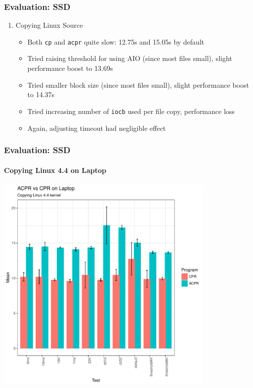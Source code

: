\documentclass{beamer}
\begin{document}
\begin{frame}
\frametitle{Evaluation: SSD}
\begin{enumerate}[1.]
	\item{Copying Linux Source}
	\begin{itemize}
		\item Both \texttt{cp} and \texttt{acpr} quite slow: 12.75s and 15.05s by default
		\item Tried raising threshold for using AIO (since most files small), slight performance boost to 13.69s
		\item Tried smaller block size (since most files small), slight performance boost to 14.37s
		\item Tried increasing number of \texttt{iocb} used per file copy, performance loss
		\item Again, adjusting timeout had negligible effect
	\end{itemize}
\end{enumerate}
\end{frame}

\begin{frame}
    \frametitle{Evaluation: SSD}
    \framesubtitle{Copying Linux 4.4 on Laptop}
    \centering
    \includegraphics[width=0.8\textwidth,height=0.8\textheight,]{Laptop_Linux_Barplot.pdf}
\end{frame}
\end{document}
